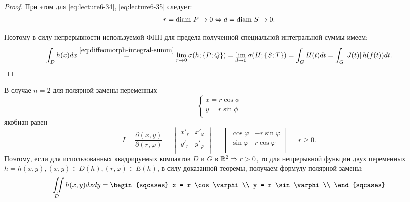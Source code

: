\begin{proof}
	При этом для \eqref{eq:lecture6-34}, \eqref{eq:lecture6-35} следует:
	\begin{equation*}
		r = \operatorname{diam\,} P \to 0 \Leftrightarrow d = \operatorname{diam\,} S \to 0.
	\end{equation*}
    
	Поэтому в силу
	непрерывности используемой ФНП для предела полученной специальной
	интегральной суммы имеем:
	\begin{equation*}
		\int_D h(x)dx \overset{\eqref{eq:diffeomorph-integral-summ}}{=}
		\lim\limits_{r \to 0}\sigma(h; \left\{ P; Q \right\}) = \lim\limits_{d \to 0}\sigma(H; \left\{ S; T \right\}) =
		\int_G H(t)dt = \int_G \left\lvert J(t) \right\rvert h(f(t))dt.
	\end{equation*}
\end{proof}

\begin{notes}
  \item В случае $n = 2$ для полярной замены переменных
	\begin{equation*}
		\begin{cases}
			x = r \cos \phi\\
			y = r \sin \phi\\
		\end{cases}
	\end{equation*}
	якобиан равен
	\begin{equation*}
		I = \dfrac{\partial(x, y)}{\partial(r, \varphi)} =
		\begin{vmatrix}
			x'_r & x'_{\varphi}\\
			y'_r & y'_{\varphi}\\
		\end{vmatrix} =
		\begin{vmatrix}
			\cos \varphi & -r \sin \varphi\\
			\sin \varphi & r \cos \varphi\\
		\end{vmatrix} = r \geqslant 0.
	\end{equation*}
	Поэтому, если для использованных квадрируемых компактов $D$ и $G$ в $\mathbb{R}^{2} \Rightarrow r > 0$,
	то для непрерывной функции двух переменных $h = h(x, y), (x, y) \in D(h), (r, \varphi) \in E(h)$,
	в силу доказанной теоремы, получаем формулу полярной замены:
	\begin{equation}
		\label{eq:2d-integral-vars}        
        \iintl_D h(x, y)dxdy =
        \begin{sqcases}
        x = r \cos \varphi\\
        y = r \sin \varphi\\

\end{sqcases}
\end{equation}
\end{notes}
